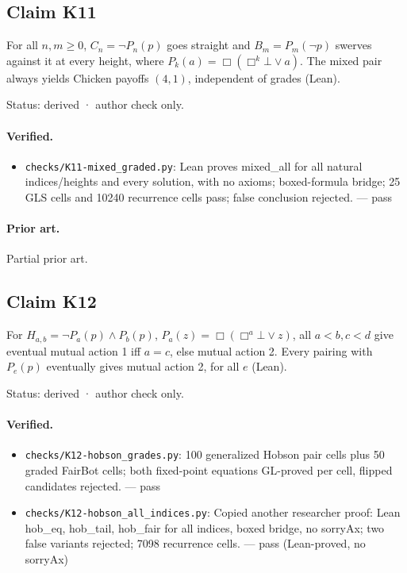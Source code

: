 \documentclass{article}
\begin{document}
\subsection*{Claim K11}

For all $n,m\ge0$, $C_n=\neg P_n(p)$ goes straight and $B_m=P_m(\neg p)$ swerves against it at every height, where $P_k(a)=\Box(\Box^k\bot\lor a)$. The mixed pair always yields Chicken payoffs $(4,1)$, independent of grades (Lean).

Status: derived · author check only.

\paragraph{Verified.}
\begin{itemize}
\item \texttt{checks/K11-mixed\_graded.py}: Lean proves mixed\_all for all natural indices/heights and every solution, with no axioms; boxed-formula bridge; 25 GLS cells and 10240 recurrence cells pass; false conclusion rejected. --- pass
\end{itemize}

\paragraph{Prior art.} Partial prior art.

\subsection*{Claim K12}

For $H_{a,b}=\neg P_a(p)\land P_b(p)$, $P_a(z)=\Box(\Box^a\bot\lor z)$, all $a<b,c<d$ give eventual mutual action 1 iff $a=c$, else mutual action 2. Every pairing with $P_e(p)$ eventually gives mutual action 2, for all $e$ (Lean).

Status: derived · author check only.

\paragraph{Verified.}
\begin{itemize}
\item \texttt{checks/K12-hobson\_grades.py}: 100 generalized Hobson pair cells plus 50 graded FairBot cells; both fixed-point equations GL-proved per cell, flipped candidates rejected. --- pass
\item \texttt{checks/K12-hobson\_all\_indices.py}: Copied another researcher proof: Lean hob\_eq, hob\_tail, hob\_fair for all indices, boxed bridge, no sorryAx; two false variants rejected; 7098 recurrence cells. --- pass (Lean-proved, no sorryAx)
\end{itemize}
\end{document}
